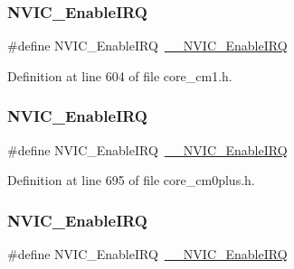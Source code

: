 \subsubsection{\texorpdfstring{N\+V\+I\+C\+\_\+\+Enable\+I\+RQ}{NVIC\_EnableIRQ}\hspace{0.1cm}{\footnotesize\ttfamily [2/13]}}
{\footnotesize\ttfamily \#define N\+V\+I\+C\+\_\+\+Enable\+I\+RQ~\hyperlink{group___c_m_s_i_s___core___n_v_i_c_functions_ga71227e1376cde11eda03fcb62f1b33ea}{\+\_\+\+\_\+\+N\+V\+I\+C\+\_\+\+Enable\+I\+RQ}}



Definition at line 604 of file core\+\_\+cm1.\+h.

\mbox{\label{group___c_m_s_i_s___core___n_v_i_c_functions_ga57b3064413dbc7459d9646020fdd8bef}} 
\subsubsection{\texorpdfstring{N\+V\+I\+C\+\_\+\+Enable\+I\+RQ}{NVIC\_EnableIRQ}\hspace{0.1cm}{\footnotesize\ttfamily [3/13]}}
{\footnotesize\ttfamily \#define N\+V\+I\+C\+\_\+\+Enable\+I\+RQ~\hyperlink{group___c_m_s_i_s___core___n_v_i_c_functions_ga71227e1376cde11eda03fcb62f1b33ea}{\+\_\+\+\_\+\+N\+V\+I\+C\+\_\+\+Enable\+I\+RQ}}



Definition at line 695 of file core\+\_\+cm0plus.\+h.

\mbox{\label{group___c_m_s_i_s___core___n_v_i_c_functions_ga57b3064413dbc7459d9646020fdd8bef}} 
\subsubsection{\texorpdfstring{N\+V\+I\+C\+\_\+\+Enable\+I\+RQ}{NVIC\_EnableIRQ}\hspace{0.1cm}{\footnotesize\ttfamily [4/13]}}
{\footnotesize\ttfamily \#define N\+V\+I\+C\+\_\+\+Enable\+I\+RQ~\hyperlink{group___c_m_s_i_s___core___n_v_i_c_functions_ga71227e1376cde11eda03fcb62f1b33ea}{\+\_\+\+\_\+\+N\+V\+I\+C\+\_\+\+Enable\+I\+RQ}}



